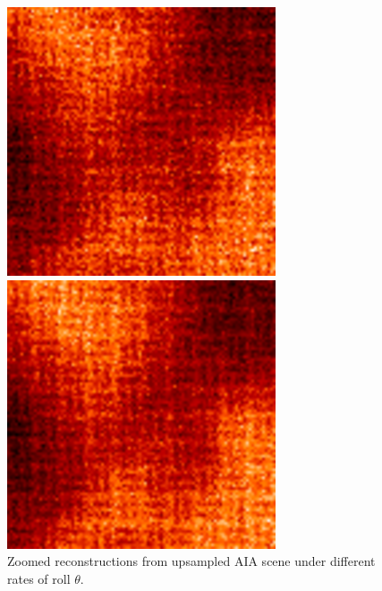 \documentclass[tocnosub,noragright,centerchapter,12pt]{uiucecethesis09}
\begin{document}
\begin{figure}
{\begin{minipage}{.19\textwidth}
  \end{minipage}%
  \begin{minipage}{.19\textwidth}
    \centering
    \includegraphics[width=.95\textwidth]{figures/aia_recon_zoom40.png}
  \end{minipage}%
  \begin{minipage}{.19\textwidth}
    \centering
    \includegraphics[width=.95\textwidth]{figures/aia_recon_zoom60.png}
  \end{minipage}%
  }
  \caption{Zoomed reconstructions from upsampled AIA scene under different rates of roll $\theta$.}
  \label{fig:mismatch}
\end{figure}
\end{document}
